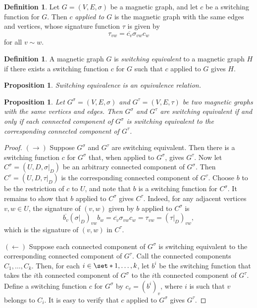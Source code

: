 \documentclass[12pt]{article}
\newtheorem{prop}[thm]{Proposition}
\theoremstyle{definition}
\newtheorem{defn}[thm]{Definition}
\begin{document}
\begin{defn}
Let $G = (V, E, \sigma)$ be a magnetic graph, and let $c$ be a switching function for $G$. Then $c$ \textit{applied to $G$} is the magnetic graph with the same edges and vertices, whose signature function $\tau$ is given by
$$\tau_{vw} = \overline{c_v}\sigma_{vw}c_w$$
for all $v \sim w$.
\end{defn}

\begin{defn}
A magnetic graph $G$ is \textit{switching equivalent} to a magnetic graph $H$ if there exists a switching function $c$ for $G$ such that $c$ applied to $G$ gives $H$.   
\end{defn}

\begin{prop}
Switching equivalence is an equivalence relation.
\end{prop}

\begin{prop}\label{switching equivalence of connected components}
Let $G^\sigma = (V, E, \sigma)$ and $G^\tau = (V, E, \tau)$ be two magnetic graphs with the same vertices and edges. Then $G^\sigma$ and $G^\tau$ are switching equivalent if and only if each connected component of $G^\sigma$ is switching equivalent to the corresponding connected component of $G^\tau$.
\end{prop}

\begin{proof}
$(\rightarrow)$ Suppose $G^\sigma$ and $G^\tau$ are switching equivalent. Then there is a switching function $c$ for $G^\sigma$ that, when applied to $G^\sigma$, gives $G^\tau$. Now let $C^\sigma=(U, D, \sigma|_{D})$ be an arbitrary connected component of $G^\sigma$. Then $C^\tau=(U, D, \tau|_{D})$ is the corresponding connected component of $G^\tau$. Choose $b$ to be the restriction of $c$ to $U$, and note that $b$ is a switching function for $C^\sigma$. It remains to show that $b$ applied to $C^\sigma$ gives $C^\tau$. Indeed, for any adjacent vertices $v, w \in U$, the signature of $(v, w)$ given by $b$ applied to $C^\sigma$ is
$$
\overline{b_v} (\sigma|_D)_{vw} b_w 
= \overline{c_v} \sigma_{vw} c_w
= \tau_{vw}
= (\tau|_{D})_{vw},
$$
which is the signature of $(v, w)$ in $C^\tau$.

$(\leftarrow)$ Suppose each connected component of $G^\sigma$ is switching equivalent to the corresponding connected component of $G^\tau$. Call the connected components $C_1, \dots, C_k.$ Then, for each $i \in \set*{1, \dots, k}$, let $b^i$ be the switching function that takes the $i$th connected component of $G^\sigma$ to the $i$th connected component of $G^\tau$. Define a switching function $c$ for $G^\sigma$ by $c_v = (b^i)_v$, where $i$ is such that $v$ belongs to $C_i$. It is easy to verify that $c$ applied to $G^\sigma$ gives $G^\tau$.
\end{proof}
\end{document}
